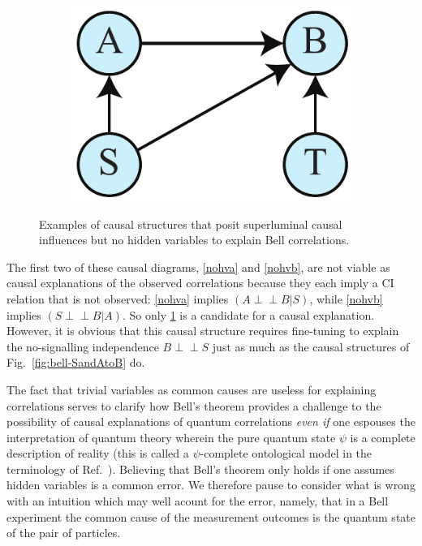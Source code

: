 \documentclass[12pt,onecolumn,nofootinbib]{revtex4-2}
\def\indep{\perp\!\!\!\!\perp}
\begin{document}
\begin{figure}[h]
\begin{subfigure}[b]{0.18\textwidth}
                	\includegraphics[width=\textwidth]{bell-gen-AB}
		\subcaption{}
			\label{nohvc}
	\end{subfigure}
 \caption{Examples of causal structures that posit superluminal causal influences but no hidden variables to explain Bell correlations.}
\label{fig:bellnohv-SandAtoB}
\end{figure}

The first two of these causal diagrams, \ref{nohva} and \ref{nohvb}, are not viable as causal explanations of the observed correlations because they each imply a CI relation that is not observed:  \ref{nohva} implies $\left( A \indep B|S\right)$, while \ref{nohvb} implies $\left( S \indep B|A \right)$.  So only \ref{nohvc} is a candidate for a causal explanation.  However, it is obvious that this causal structure requires fine-tuning to explain the no-signalling independence $B \indep S$ just as much as the causal structures of Fig.~\ref{fig:bell-SandAtoB} do.   


The fact that trivial variables as common causes are useless for explaining correlations
serves to clarify how Bell's theorem provides a challenge to the possibility of causal explanations of quantum correlations  
{\em even if} one espouses the interpretation of quantum theory wherein the pure quantum state $\psi$ is a complete description of reality (this is called a $\psi$-complete ontological model in the terminology of Ref.~\cite{Harrigan2010}).  Believing that Bell's theorem only holds if one assumes hidden variables is a common error.  We therefore pause to consider what is wrong with an intuition which may well acount for the error, namely, that in a Bell experiment the common cause of the measurement outcomes is the quantum state of the pair of particles.  
\end{document}
